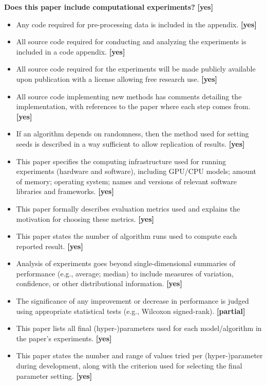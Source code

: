 \documentclass[11pt]{article}
\newcommand{\ans}[1]{\textbf{[#1]}}
\begin{document}
\bigskip
\noindent\textbf{Does this paper include computational experiments?} \ans{yes}
\begin{itemize}
  \item Any code required for pre-processing data is included in the appendix. \ans{yes}
  \item All source code required for conducting and analyzing the experiments is included
        in a code appendix. \ans{yes}
  \item All source code required for the experiments will be made publicly available upon
        publication with a license allowing free research use. \ans{yes}
  \item All source code implementing new methods has comments detailing the
        implementation, with references to the paper where each step comes from. \ans{yes}
  \item If an algorithm depends on randomness, then the method used for setting seeds is
        described in a way sufficient to allow replication of results. \ans{yes}
  \item This paper specifies the computing infrastructure used for running experiments
        (hardware and software), including GPU/CPU models; amount of memory; operating
        system; names and versions of relevant software libraries and frameworks. \ans{yes}
  \item This paper formally describes evaluation metrics used and explains the motivation
        for choosing these metrics. \ans{yes}
  \item This paper states the number of algorithm runs used to compute each reported
        result. \ans{yes}
  \item Analysis of experiments goes beyond single-dimensional summaries of performance
        (e.g., average; median) to include measures of variation, confidence, or other
        distributional information. \ans{yes}
  \item The significance of any improvement or decrease in performance is judged using
        appropriate statistical tests (e.g., Wilcoxon signed-rank). \ans{partial}
  \item This paper lists all final (hyper-)parameters used for each model/algorithm in
        the paper's experiments. \ans{yes}
  \item This paper states the number and range of values tried per (hyper-)parameter
        during development, along with the criterion used for selecting the final
        parameter setting. \ans{yes}
\end{itemize}
\end{document}
